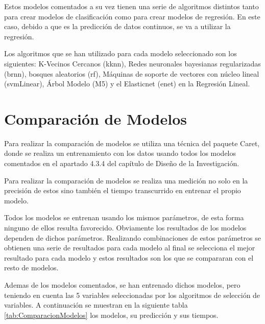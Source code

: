Estos modelos comentados a su vez tienen una serie de algoritmos distintos tanto para crear modelos de clasificación como para crear modelos de regresión. En este caso, debido a que es la predicción de datos continuos, se va a utilizar la regresión.

Los algoritmos que se han utilizado para cada modelo seleccionado son los siguientes: K-Vecinos Cercanos (kknn), Redes neuronales bayesianas regularizadas (brnn), bosques aleatorios (rf), Máquinas de soporte de vectores con núcleo lineal (svmLinear), Árbol Modelo (M5) y el Elasticnet (enet) en la Regresión Lineal.

\begin{subappendices}
	\label{appendix:B}
\section{Comparación de Modelos}

Para realizar la comparación de modelos se utiliza una técnica del paquete Caret, donde se realiza un entrenamiento con los datos usando todos los modelos comentados en el apartado 4.3.4 del capítulo de Diseño de la Investigación. 

Para realizar la comparación de modelos se realiza una medición no solo en la precisión de estos sino también el tiempo transcurrido en entrenar el propio modelo.

Todos los modelos se entrenan usando los mismos parámetros, de esta forma ninguno de ellos resulta favorecido. Obviamente los resultados de los modelos dependen de dichos parámetros. Realizando combinaciones de estos parámetros se obtienen una serie de resultados para cada modelo al final se selecciona el mejor resultado para cada modelo y estos resultados son los que se compararan con el resto de modelos.

Ademas de los modelos comentados, se han entrenado dichos modelos, pero teniendo en cuenta las 5 variables seleccionadas por los algoritmos de selección de variables. A continuación se muestran en la siguiente tabla \ref{tab:ComparacionModelos} los modelos, su predicción y sus tiempos.


\end{subappendices}
